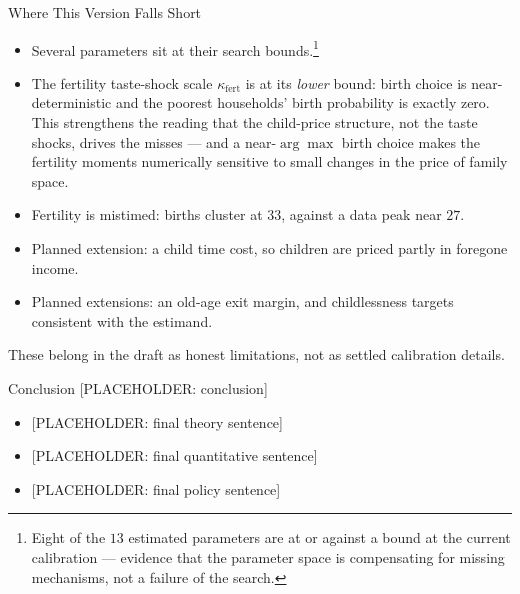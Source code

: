 \documentclass[aspectratio=169,10pt]{beamer}
\providecommand{\1}{\mathbf 1}
\begin{document}
\begin{frame}{Where This Version Falls Short}
  \begin{itemize}
    \item Several parameters sit at their search bounds.\footnote{Eight of the $13$ estimated parameters are at or against a bound at the current calibration --- evidence that the parameter space is compensating for missing mechanisms, not a failure of the search.}
    \item The fertility taste-shock scale $\kappa_{\mathrm{fert}}$ is at its \emph{lower} bound: birth choice is near-deterministic and the poorest households' birth probability is exactly zero. This strengthens the reading that the child-price structure, not the taste shocks, drives the misses --- and a near-$\arg\max$ birth choice makes the fertility moments numerically sensitive to small changes in the price of family space.
    \item Fertility is mistimed: births cluster at $33$, against a data peak near $27$.
    \item Planned extension: a child time cost, so children are priced partly in foregone income.
    \item Planned extensions: an old-age exit margin, and childlessness targets consistent with the estimand.
  \end{itemize}
  These belong in the draft as honest limitations, not as settled calibration details.
\end{frame}

\begin{frame}{Conclusion}
  \alert{[PLACEHOLDER: conclusion]}
  \begin{itemize}
    \item {[}PLACEHOLDER: final theory sentence]
    \item {[}PLACEHOLDER: final quantitative sentence]
    \item {[}PLACEHOLDER: final policy sentence]
  \end{itemize}
\end{frame}
\end{document}
